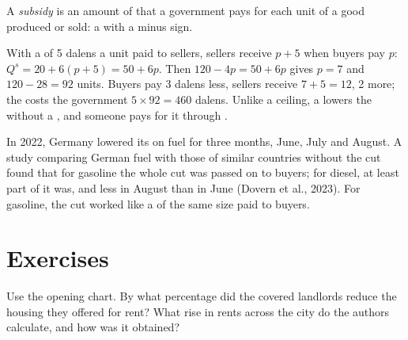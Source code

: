 \begin{definition}[Subsidy]\label{def:g9:price-controls-taxes-subsidies:subsidy}
A \emph{subsidy} is an amount of  that a government pays for each unit of a good
produced or sold: a  with a minus sign.
\end{definition}

With a  of 5 dalens a unit paid to sellers, sellers receive $p + 5$ when buyers pay $p$:
$Q^s = 20 + 6(p + 5) = 50 + 6p$. Then $120 - 4p = 50 + 6p$ gives $p = 7$ and $120 - 28 = 92$ units. Buyers pay
3 dalens less, sellers receive $7 + 5 = 12$, 2 more; the  costs the government $5 \times 92 = 460$
dalens. Unlike a ceiling, a  lowers the  without a , and someone pays for it through
.

\begin{record}
In 2022, Germany lowered its  on fuel for three months, June, July and August.
A study comparing German fuel  with those of similar countries without the cut found that for
gasoline the whole  cut was passed on to buyers; for diesel, at least part of it was, and less in
August than in June (Dovern et al., 2023). For gasoline, the  cut worked like a  of the same
size paid to buyers.
\end{record}

\section{Exercises}

\begin{exercise}[$\star$]\label{exo:g9:price-controls-taxes-subsidies:1}
Use the opening chart. By what percentage did the covered landlords reduce the housing they offered for
rent? What rise in rents across the city do the authors calculate, and how was it obtained?
\end{exercise}

